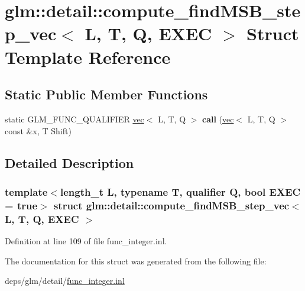 \hypertarget{structglm_1_1detail_1_1compute__findMSB__step__vec}{}\section{glm\+:\+:detail\+:\+:compute\+\_\+find\+M\+S\+B\+\_\+step\+\_\+vec$<$ L, T, Q, E\+X\+EC $>$ Struct Template Reference}
\label{structglm_1_1detail_1_1compute__findMSB__step__vec}
\subsection*{Static Public Member Functions}
\begin{DoxyCompactItemize}
\item 
\mbox{\label{structglm_1_1detail_1_1compute__findMSB__step__vec_ad2bb7c372d1a7b44269af72d8f7dbc73}} 
static G\+L\+M\+\_\+\+F\+U\+N\+C\+\_\+\+Q\+U\+A\+L\+I\+F\+I\+ER \hyperlink{structglm_1_1vec}{vec}$<$ L, T, Q $>$ {\bfseries call} (\hyperlink{structglm_1_1vec}{vec}$<$ L, T, Q $>$ const \&x, T Shift)
\end{DoxyCompactItemize}


\subsection{Detailed Description}
\subsubsection*{template$<$length\+\_\+t L, typename T, qualifier Q, bool E\+X\+EC = true$>$\newline
struct glm\+::detail\+::compute\+\_\+find\+M\+S\+B\+\_\+step\+\_\+vec$<$ L, T, Q, E\+X\+E\+C $>$}



Definition at line 109 of file func\+\_\+integer.\+inl.



The documentation for this struct was generated from the following file\+:\begin{DoxyCompactItemize}
\item 
deps/glm/detail/\hyperlink{func__integer_8inl}{func\+\_\+integer.\+inl}\end{DoxyCompactItemize}
